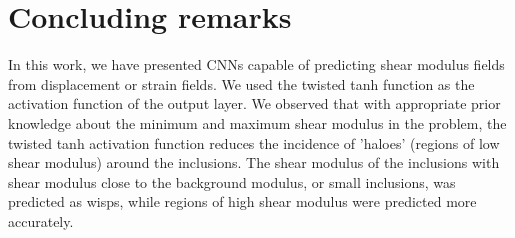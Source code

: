 \documentclass[12pt]{article}
\begin{document}
\section{Concluding remarks}
In this work, we have presented CNNs capable of predicting shear modulus fields from displacement or strain fields. We used the twisted tanh function as the activation function of the output layer. We observed that with appropriate prior knowledge about the minimum and maximum shear modulus in the problem, the twisted tanh activation function reduces the incidence of 'haloes' (regions of low shear modulus) around the inclusions. The shear modulus of the inclusions with shear modulus close to the background modulus, or small inclusions, was predicted as wisps, while regions of high shear modulus were predicted more accurately.    
\end{document}
